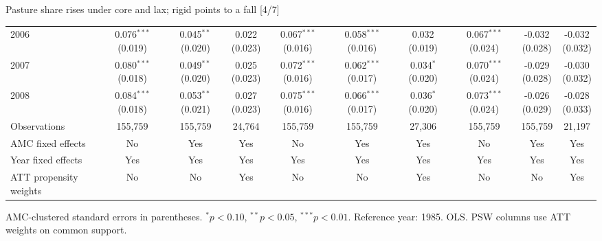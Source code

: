 \documentclass[aspectratio=169]{beamer}
\begin{document}
\begin{frame}{Pasture share rises under core and lax; rigid points to a fall [4/7]}
{\begin{tabular}{@{}l*{9}{c}@{}}
2006 & \shortstack{0.076$^{***}$\\(0.019)} & \shortstack{0.045$^{**}$\\(0.020)} & \shortstack{0.022\\(0.023)} & \shortstack{0.067$^{***}$\\(0.016)} & \shortstack{0.058$^{***}$\\(0.016)} & \shortstack{0.032\\(0.019)} & \shortstack{0.067$^{***}$\\(0.024)} & \shortstack{-0.032\\(0.028)} & \shortstack{-0.032\\(0.032)} \\
2007 & \shortstack{0.080$^{***}$\\(0.018)} & \shortstack{0.049$^{**}$\\(0.020)} & \shortstack{0.025\\(0.023)} & \shortstack{0.072$^{***}$\\(0.016)} & \shortstack{0.062$^{***}$\\(0.017)} & \shortstack{0.034$^{*}$\\(0.020)} & \shortstack{0.070$^{***}$\\(0.024)} & \shortstack{-0.029\\(0.028)} & \shortstack{-0.030\\(0.032)} \\
2008 & \shortstack{0.084$^{***}$\\(0.018)} & \shortstack{0.053$^{**}$\\(0.021)} & \shortstack{0.027\\(0.023)} & \shortstack{0.075$^{***}$\\(0.016)} & \shortstack{0.066$^{***}$\\(0.017)} & \shortstack{0.036$^{*}$\\(0.020)} & \shortstack{0.073$^{***}$\\(0.024)} & \shortstack{-0.026\\(0.029)} & \shortstack{-0.028\\(0.033)} \\
\midrule
Observations & 155,759 & 155,759 & 24,764 & 155,759 & 155,759 & 27,306 & 155,759 & 155,759 & 21,197 \\
AMC fixed effects & No & Yes & Yes & No & Yes & Yes & No & Yes & Yes \\
Year fixed effects & Yes & Yes & Yes & Yes & Yes & Yes & Yes & Yes & Yes \\
ATT propensity weights & No & No & Yes & No & No & Yes & No & No & Yes \\
\bottomrule
\end{tabular}%
}
\vspace{0.1em}
{\tiny\color{ZMidGray} AMC-clustered standard errors in parentheses. $^{*}p<0.10$, $^{**}p<0.05$, $^{***}p<0.01$. Reference year: 1985. OLS. PSW columns use ATT weights on common support.}
\end{frame}
\end{document}

